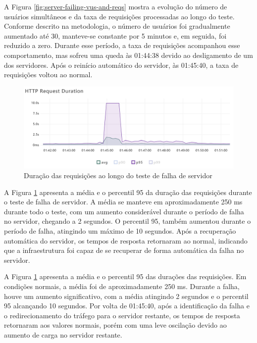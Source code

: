 A Figura \ref{fig:server-failing-vus-and-reqs} mostra a evolução do número de usuários simultâneos e da taxa de requisições processadas ao longo do teste. Conforme descrito na metodologia, o número de usuários foi gradualmente aumentado até 30, manteve-se constante por 5 minutos e, em seguida, foi reduzido a zero. Durante esse período, a taxa de requisições acompanhou esse comportamento, mas sofreu uma queda às 01:44:38 devido ao desligamento de um dos servidores. Após o reinício automático do servidor, às 01:45:40, a taxa de requisições voltou ao normal.

\begin{figure}[H]
    \centering
    \includegraphics[width=1\textwidth]{assets/server-failing-test/req-duration.png}
    \caption{Duração das requisições ao longo do teste de falha de servidor}
    \label{fig:server-failing-req-duration}
\end{figure}

A Figura \ref{fig:server-failing-req-duration} apresenta a média e o percentil 95 da duração das requisições durante o teste de falha de servidor. A média se manteve em aproximadamente 250 ms durante todo o teste, com um aumento considerável durante o período de falha no servidor, chegando a 2 segundos. O percentil 95, também aumentou durante o período de falha, atingindo um máximo de 10 segundos. Após a recuperação automática do servidor, os tempos de resposta retornaram ao normal, indicando que a infraestrutura foi capaz de se recuperar de forma automática da falha no servidor.

A Figura \ref{fig:server-failing-req-duration} apresenta a média e o percentil 95 das durações das requisições. Em condições normais, a média foi de aproximadamente 250 ms. Durante a falha, houve um aumento significativo, com a média atingindo 2 segundos e o percentil 95 alcançando 10 segundos. Por volta de 01:45:40, após a identificação da falha e o redirecionamento do tráfego para o servidor restante, os tempos de resposta retornaram aos valores normais, porém com uma leve oscilação devido ao aumento de carga no servidor restante.

